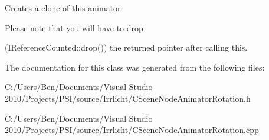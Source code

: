 Creates a clone of this animator. 

\begin{DoxyVerb}Please note that you will have to drop
\end{DoxyVerb}
 (I\-Reference\-Counted\-::drop()) the returned pointer after calling this. 

The documentation for this class was generated from the following files\-:\begin{DoxyCompactItemize}
\item 
C\-:/\-Users/\-Ben/\-Documents/\-Visual Studio 2010/\-Projects/\-P\-S\-I/source/\-Irrlicht/C\-Scene\-Node\-Animator\-Rotation.\-h\item 
C\-:/\-Users/\-Ben/\-Documents/\-Visual Studio 2010/\-Projects/\-P\-S\-I/source/\-Irrlicht/C\-Scene\-Node\-Animator\-Rotation.\-cpp\end{DoxyCompactItemize}
